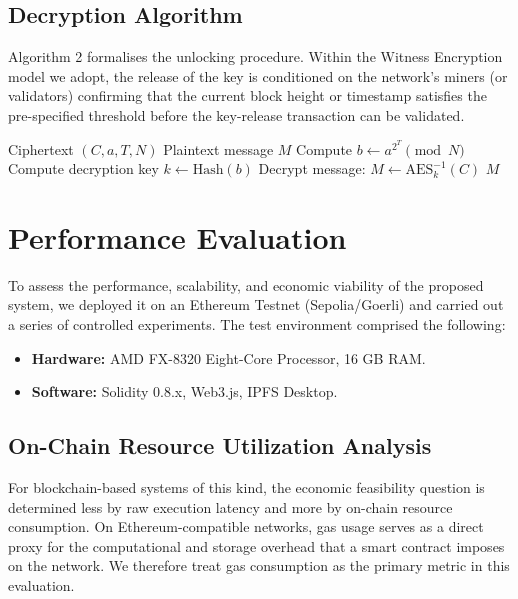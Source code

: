 \documentclass[final,5p,times]{elsarticle}
\begin{document}
\subsection{Decryption Algorithm}
Algorithm 2 formalises the unlocking procedure. Within the Witness Encryption model we adopt, the release of the key is conditioned on the network's miners (or validators) confirming that the current block height or timestamp satisfies the pre-specified threshold before the key-release transaction can be validated.

\begin{algorithm}[H]
\caption{Time-Lock Puzzle Decryption}
\label{alg:decryption}
\begin{algorithmic}[1]
\REQUIRE Ciphertext $(C, a, T, N)$
\ENSURE Plaintext message $M$
\STATE Compute $b \leftarrow a^{2^T} \pmod N$ 
\STATE Compute decryption key $k \leftarrow \text{Hash}(b)$
\STATE Decrypt message: $M \leftarrow \text{AES}_k^{-1}(C)$
\RETURN $M$
\end{algorithmic}
\end{algorithm}

\section{Performance Evaluation}

To assess the performance, scalability, and economic viability of the proposed system, we deployed it on an Ethereum Testnet (Sepolia/Goerli) and carried out a series of controlled experiments. The test environment comprised the following:
\begin{itemize}
    \item \textbf{Hardware:} AMD FX-8320 Eight-Core Processor, 16 GB RAM.
    \item \textbf{Software:} Solidity 0.8.x, Web3.js, IPFS Desktop.
\end{itemize}

\subsection{On-Chain Resource Utilization Analysis}

For blockchain-based systems of this kind, the economic feasibility question is determined less by raw execution latency and more by on-chain resource consumption. On Ethereum-compatible networks, gas usage serves as a direct proxy for the computational and storage overhead that a smart contract imposes on the network. We therefore treat gas consumption as the primary metric in this evaluation.
\end{document}
